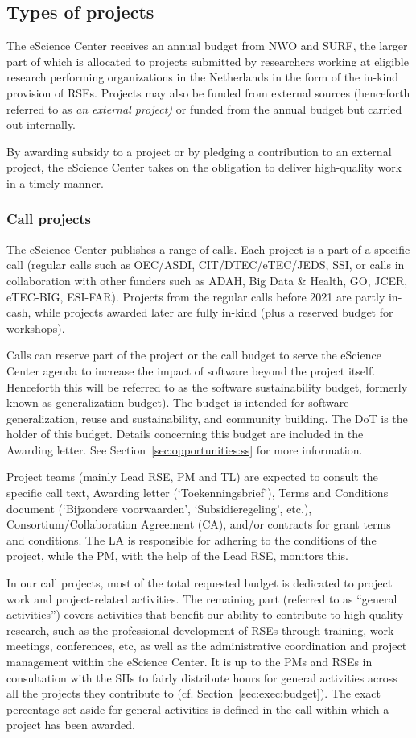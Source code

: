 \documentclass[11pt]{article}
\begin{document}
\subsection{Types of projects}
The eScience Center receives an annual budget from NWO and SURF, the larger part of which is allocated to projects
submitted by researchers working at eligible research performing organizations in the Netherlands in the form of the
in-kind provision of RSEs. Projects may also be funded from external sources (henceforth referred to as \textit{an
external project) }or funded from the annual budget but carried out internally.

By awarding subsidy to a project or by pledging a contribution to an external project, the eScience Center takes on the
obligation to deliver high-quality work in a timely manner.

\subsubsection{Call projects}
The eScience Center publishes a range of calls. Each project is a part of a specific call (regular calls such as
OEC/ASDI, CIT/DTEC/eTEC/JEDS, SSI, or calls in collaboration with other funders such as ADAH, Big Data \& Health, GO,
JCER, eTEC-BIG, ESI-FAR). Projects from the regular calls before 2021 are partly in-cash, while projects awarded later
are fully in-kind (plus a reserved budget for workshops).

Calls can reserve part of the project or the call budget to serve the eScience Center agenda to increase the impact of
software beyond the project itself. Henceforth this will be referred to as the software sustainability budget, formerly
known as generalization budget). The budget is intended for software generalization, reuse and sustainability, and
community building. The DoT is the holder of this budget. Details concerning this budget are included in the Awarding
letter. See Section~\ref{sec:opportunities:ss} for more information.

Project teams (mainly Lead RSE, PM and TL) are expected to consult the specific call text, Awarding letter
(‘Toekenningsbrief’), Terms and Conditions document (‘Bijzondere voorwaarden’, ‘Subsidieregeling’, etc.), Consortium/Collaboration Agreement (CA), and/or
contracts for grant terms and conditions. The LA is responsible for adhering to the conditions of the project, while
the PM, with the help of the Lead RSE, monitors this.

In our call projects, most of the total requested budget is dedicated to project work and project-related activities.
The remaining part (referred to as “general activities”) covers activities that benefit our ability to contribute to
high-quality research, such as the professional development of RSEs through training, work meetings, conferences, etc,
as well as the administrative coordination and project management within the eScience Center. It is up to the PMs and
RSEs in consultation with the SHs to fairly distribute hours for general activities across all the projects they
contribute to (cf. Section~\ref{sec:exec:budget}). The exact percentage set aside for general activities is defined in
the call within which a project has been awarded.
\end{document}
